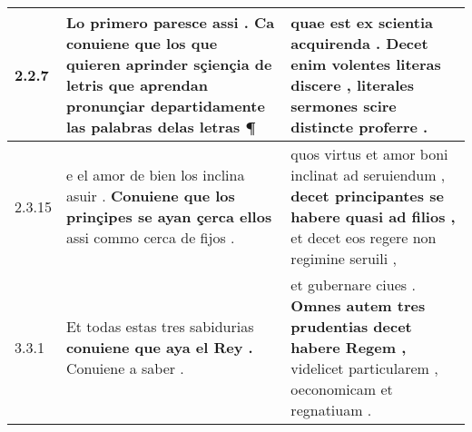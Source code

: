 \begin{tabular}{|p{1cm}|p{6.5cm}|p{6.5cm}|}

\hline
2.2.7 & Lo primero paresce assi . \textbf{ Ca conuiene que los que quieren aprinder sçiençia de letris } que aprendan pronunçiar departidamente las palabras delas letras ¶ & quae est ex scientia acquirenda . \textbf{ Decet enim volentes literas discere , } literales sermones scire distincte proferre . \\\hline
2.3.15 & e el amor de bien los inclina asuir . \textbf{ Conuiene que los prinçipes se ayan çerca ellos } assi commo cerca de fijos . & quos virtus et amor boni inclinat ad seruiendum , \textbf{ decet principantes se habere quasi ad filios , } et decet eos regere non regimine seruili , \\\hline
3.3.1 & Et todas estas tres sabidurias \textbf{ conuiene que aya el Rey . } Conuiene a saber . & et gubernare ciues . \textbf{ Omnes autem tres prudentias decet habere Regem , } videlicet particularem , oeconomicam et regnatiuam . \\\hline

\end{tabular}
